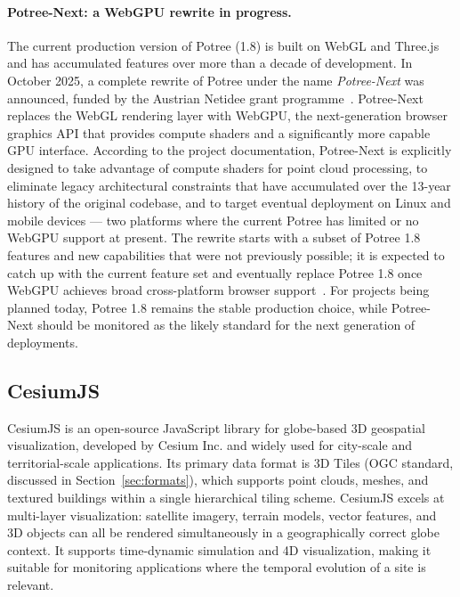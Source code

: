 \documentclass[]{report}
\begin{document}
\paragraph{Potree-Next: a WebGPU rewrite in progress.}
The current production version of Potree (1.8) is built on WebGL and Three.js and has
accumulated features over more than a decade of development. In October 2025, a complete rewrite of Potree under the name \emph{Potree-Next} was announced, funded
by the Austrian Netidee grant programme~\cite{potreenext_github}. Potree-Next replaces the
WebGL rendering layer with WebGPU, the next-generation browser graphics API that provides
compute shaders and a significantly more capable GPU interface. According to the project
documentation, Potree-Next is explicitly designed to take advantage of compute shaders for
point cloud processing, to eliminate legacy architectural constraints that have accumulated
over the 13-year history of the original codebase, and to target eventual deployment on Linux
and mobile devices --- two platforms where the current Potree has limited or no WebGPU support
at present. The rewrite starts with a subset of Potree 1.8 features and new capabilities that
were not previously possible; it is expected to catch up with the current feature set and
eventually replace Potree 1.8 once WebGPU achieves broad cross-platform browser
support~\cite{potreenext_github}. For projects being planned today, Potree 1.8 remains the
stable production choice, while Potree-Next should be monitored as the likely standard for
the next generation of deployments.

\subsection{CesiumJS}

CesiumJS is an open-source JavaScript library for globe-based 3D geospatial visualization,
developed by Cesium Inc. and widely used for city-scale and territorial-scale applications.
Its primary data format is 3D Tiles (OGC standard, discussed in Section~\ref{sec:formats}),
which supports point clouds, meshes, and textured buildings within a single
hierarchical tiling scheme. CesiumJS excels at multi-layer visualization: satellite imagery,
terrain models, vector features, and 3D objects can all be rendered simultaneously in a
geographically correct globe context. It supports time-dynamic simulation and 4D
visualization, making it suitable for monitoring applications where the temporal evolution
of a site is relevant.
\end{document}

